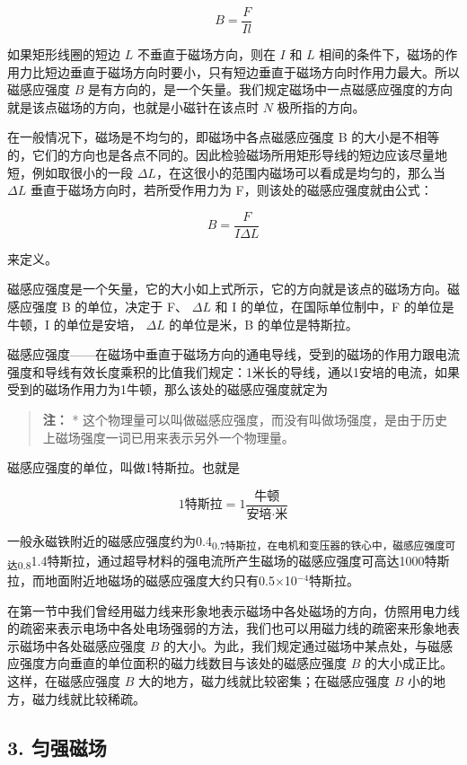 \[
B=\frac{F}{Il} \tag{3.1}
\]

如果矩形线圈的短边 \(L\) 不垂直于磁场方向，则在 \(I\) 和 \(L\)
相间的条件下，磁场的作用力比短边垂直于磁场方向时要小，只有短边垂直于磁场方向时作用力最大。所以磁感应强度
\(B\)
是有方向的，是一个矢量。我们规定磁场中一点磁感应强度的方向就是该点磁场的方向，也就是小磁针在该点时
\(N\) 极所指的方向。

在一般情况下，磁场是不均匀的，即磁场中各点磁感应强度 B
的大小是不相等的，它们的方向也是各点不同的。因此检验磁场所用矩形导线的短边应该尽量地短，例如取很小的一段
\(\Delta L\)，在这很小的范围内磁场可以看成是均匀的，那么当 \(\Delta L\)
垂直于磁场方向时，若所受作用力为 F，则该处的磁感应强度就由公式：

\[
B=\frac{F}{I\Delta L} \tag{3.2}
\]

来定义。

磁感应强度是一个矢量，它的大小如上式所示，它的方向就是该点的磁场方向。磁感应强度
B 的单位，决定于 F、 \(\Delta L\) 和 I 的单位，在国际单位制中，F
的单位是牛顿，I 的单位是安培， \(\Delta L\) 的单位是米，B
的单位是特斯拉。

磁感应强度------在磁场中垂直于磁场方向的通电导线，受到的磁场的作用力跟电流强度和导线有效长度乘积的比值我们规定：1米长的导线，通以1安培的电流，如果受到的磁场作用力为1牛顿，那么该处的磁感应强度就定为

\begin{quote}
\textbf{注：} *
这个物理量可以叫做磁感应强度，而没有叫做场强度，是由于历史上磁场强度一词已用来表示另外一个物理量。
\end{quote}

磁感应强度的单位，叫做1特斯拉。也就是

\[
1 \text{特斯拉} = 1 \frac{\text{牛顿}}{\text{安培} \cdot \text{米}}
\]

一般永磁铁附近的磁感应强度约为0.4\textsubscript{0.7特斯拉，在电机和变压器的铁心中，磁感应强度可达0.8}1.4特斯拉，通过超导材料的强电流所产生磁场的磁感应强度可高达1000特斯拉，而地面附近地磁场的磁感应强度大约只有0.5×10\(^{-4}\)特斯拉。

在第一节中我们曾经用磁力线来形象地表示磁场中各处磁场的方向，仿照用电力线的疏密来表示电场中各处电场强弱的方法，我们也可以用磁力线的疏密来形象地表示磁场中各处磁感应强度
\(B\)
的大小。为此，我们规定通过磁场中某点处，与磁感应强度方向垂直的单位面积的磁力线数目与该处的磁感应强度
\(B\) 的大小成正比。这样，在磁感应强度 \(B\)
大的地方，磁力线就比较密集；在磁感应强度 \(B\)
小的地方，磁力线就比较稀疏。

\subsection{3. 匀强磁场}\label{ux5300ux5f3aux78c1ux573a}

